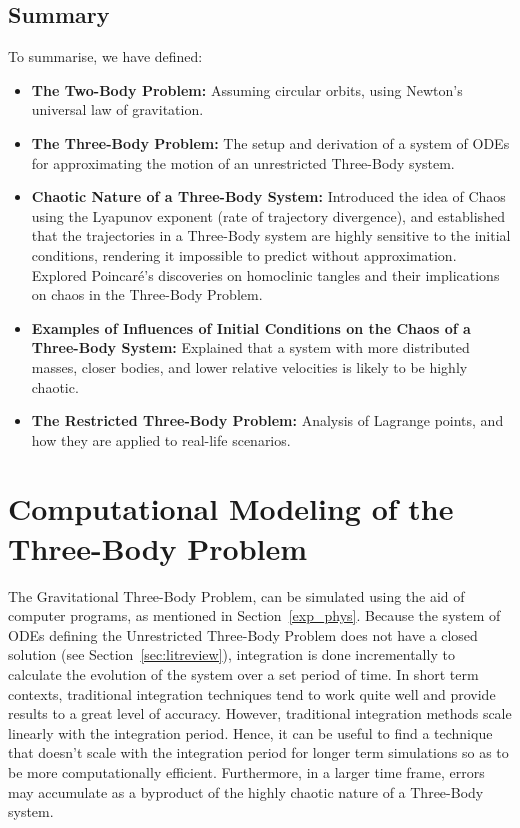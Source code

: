 \documentclass[12pt,a4paper]{article}
\begin{document}
\subsection{Summary}

To summarise, we have defined:

\begin{itemize}
    \item \textbf{The Two-Body Problem:} Assuming circular orbits, using Newton's universal law of gravitation.
    \item \textbf{The Three-Body Problem:} The setup and derivation of a system of ODEs for approximating the motion of an unrestricted Three-Body system.
    \item \textbf{Chaotic Nature of a Three-Body System:} Introduced the idea of Chaos using the Lyapunov exponent (rate of trajectory divergence), and established that the trajectories in a Three-Body system are highly sensitive to the initial conditions, rendering it impossible to predict without approximation. Explored Poincar\'{e}'s discoveries on homoclinic tangles and their implications on chaos in the Three-Body Problem.
    \item \textbf{Examples of Influences of Initial Conditions on the Chaos of a Three-Body System:} Explained that a system with more distributed masses, closer bodies, and lower relative velocities is likely to be highly chaotic.
    \item \textbf{The Restricted Three-Body Problem:} Analysis of Lagrange points, and how they are applied to real-life scenarios.
\end{itemize}

\section{Computational Modeling of the Three-Body Problem}
\label{sec:comp_modeling}
The Gravitational Three-Body Problem, can be simulated using the aid of computer programs, as mentioned in Section~\ref{exp_phys}. Because the system of ODEs defining the Unrestricted Three-Body Problem does not have a closed solution (see Section~\ref{sec:litreview}), integration is done incrementally to calculate the evolution of the system over a set period of time. In short term contexts, traditional integration techniques tend to work quite well and provide results to a great level of accuracy. However, traditional integration methods scale linearly with the integration period. Hence, it can be useful to find a technique that doesn't scale with the integration period for longer term simulations so as to be more computationally efficient. Furthermore, in a larger time frame, errors may accumulate as a byproduct of the highly chaotic nature of a Three-Body system.
\end{document}
